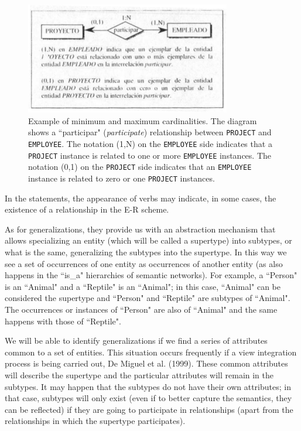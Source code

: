 \documentclass{article}
\begin{document}
\begin{figure}
    \centering
    \includegraphics[width=0.8\textwidth]{figures/fig2}
    \caption{Example of minimum and maximum cardinalities. The diagram shows a ``participar" (\textit{participate}) relationship between \texttt{PROJECT} and \texttt{EMPLOYEE}. The notation (1,N) on the \texttt{EMPLOYEE} side indicates that a \texttt{PROJECT} instance is related to one or more \texttt{EMPLOYEE} instances. The notation (0,1) on the \texttt{PROJECT} side indicates that an \texttt{EMPLOYEE} instance is related to zero or one \texttt{PROJECT} instances.}
    \label{fig:fig1.2}
\end{figure}

In the statements, the appearance of verbs may indicate, in some cases, the existence of a relationship in the E-R scheme.

As for generalizations, they provide us with an abstraction mechanism that allows specializing an entity (which will be called a supertype) into subtypes, or what is the same, generalizing the subtypes into the supertype.  In this way we see a set of occurrences of one entity as occurrences of another entity (as also happens in the ``is\_a" hierarchies of semantic networks).  For example, a ``Person" is an ``Animal" and a ``Reptile" is an ``Animal"; in this case, ``Animal" can be considered the supertype and ``Person" and ``Reptile" are subtypes of ``Animal".  The occurrences or instances of ``Person" are also of ``Animal" and the same happens with those of ``Reptile".

We will be able to identify generalizations if we find a series of attributes common to a set of entities.  This situation occurs frequently if a view integration process is being carried out, De Miguel et al. (1999).  These common attributes will describe the supertype and the particular attributes will remain in the subtypes.  It may happen that the subtypes do not have their own attributes; in that case, subtypes will only exist (even if to better capture the semantics, they can be reflected) if they are going to participate in relationships (apart from the relationships in which the supertype participates).
\end{document}
